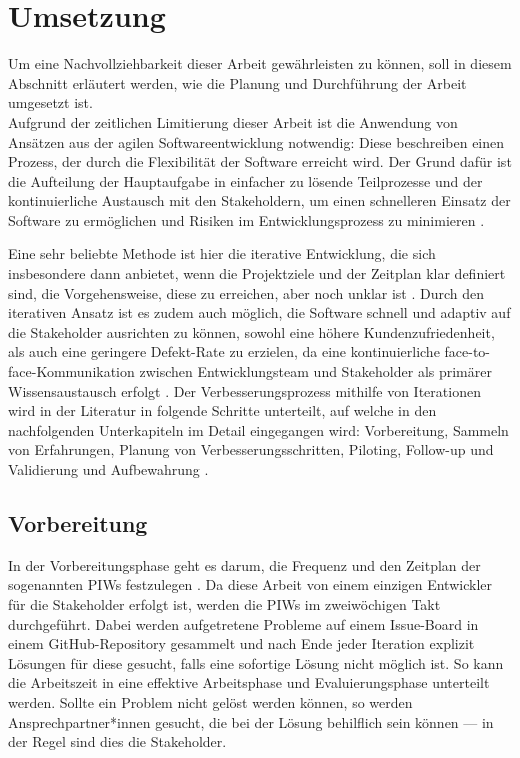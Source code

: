 \section{Umsetzung}
\label{sec:umsetzung}
Um eine Nachvollziehbarkeit dieser Arbeit gewährleisten zu können, soll in diesem Abschnitt erläutert werden, wie die Planung und Durchführung der Arbeit umgesetzt ist.\\ Aufgrund der zeitlichen Limitierung dieser Arbeit ist die Anwendung von Ansätzen aus der agilen Softwareentwicklung notwendig: Diese beschreiben einen Prozess, der durch die Flexibilität der Software erreicht wird. Der Grund dafür ist die Aufteilung der Hauptaufgabe in einfacher zu lösende Teilprozesse und der kontinuierliche Austausch mit den Stakeholdern, um einen schnelleren Einsatz der Software zu ermöglichen und Risiken im Entwicklungsprozess zu minimieren \cite{Siepermann2018}. 

Eine sehr beliebte Methode ist hier die iterative Entwicklung, die sich insbesondere dann anbietet, wenn die Projektziele und der Zeitplan klar definiert sind, die Vorgehensweise, diese zu erreichen, aber noch unklar ist \cite{salo2007iterative}. Durch den iterativen Ansatz ist es zudem auch möglich, die Software schnell und adaptiv auf die Stakeholder ausrichten zu können, sowohl eine höhere Kundenzufriedenheit, als auch eine geringere Defekt-Rate zu erzielen, da eine kontinuierliche face-to-face-Kommunikation zwischen Entwicklungsteam und Stakeholder als primärer Wissensaustausch erfolgt \cite{salo2007iterative}. Der Verbesserungsprozess mithilfe von Iterationen wird in der Literatur in folgende Schritte unterteilt, auf welche in den nachfolgenden Unterkapiteln im Detail eingegangen wird: Vorbereitung, Sammeln von Erfahrungen, Planung von Verbesserungsschritten, Piloting, Follow-up und Validierung und Aufbewahrung \cite{salo2007iterative}.

\subsection{Vorbereitung}
In der Vorbereitungsphase geht es darum, die Frequenz und den Zeitplan der sogenannten \ac{PIW}s festzulegen \cite{salo2007iterative}. Da diese Arbeit von einem einzigen Entwickler für die Stakeholder erfolgt ist, werden die PIWs im zweiwöchigen Takt durchgeführt. Dabei werden aufgetretene Probleme auf einem Issue-Board in einem GitHub-Repository gesammelt und nach Ende jeder Iteration explizit Lösungen für diese gesucht, falls eine sofortige Lösung nicht möglich ist. So kann die Arbeitszeit in eine effektive Arbeitsphase und Evaluierungsphase unterteilt werden. Sollte ein Problem nicht gelöst werden können, so werden Ansprechpartner*innen gesucht, die bei der Lösung behilflich sein können --- in der Regel sind dies die Stakeholder.

